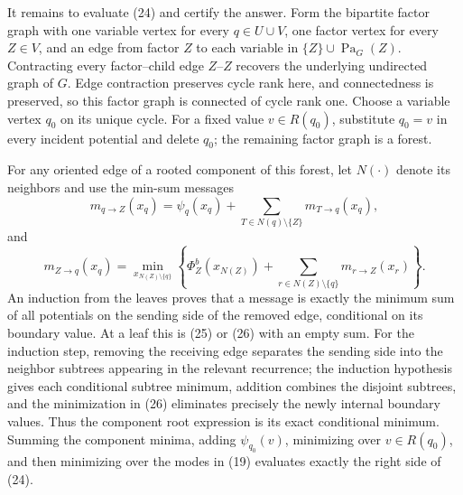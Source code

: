 It remains to evaluate (24) and certify the answer.  Form the bipartite factor graph with one variable vertex for every \(q\in U\cup V\), one factor vertex for every \(Z\in V\), and an edge from factor \(Z\) to each variable in \(\{Z\}\cup\operatorname{Pa}_G(Z)\).  Contracting every factor--child edge \(Z\text{--}Z\) recovers the underlying undirected graph of \(G\).  Edge contraction preserves cycle rank here, and connectedness is preserved, so this factor graph is connected of cycle rank one.  Choose a variable vertex \(q_0\) on its unique cycle.  For a fixed value \(v\in R(q_0)\), substitute \(q_0=v\) in every incident potential and delete \(q_0\); the remaining factor graph is a forest.

For any oriented edge of a rooted component of this forest, let \(N(\cdot)\) denote its neighbors and use the min-sum messages
\[
 m_{q\to Z}(x_q)
 =\psi_q(x_q)+
   \sum_{T\in N(q)\setminus\{Z\}}m_{T\to q}(x_q),                    \tag{25}
\]
and
\[
 m_{Z\to q}(x_q)
 =\min_{x_{N(Z)\setminus\{q\}}}
 \left\{
  \Phi_Z^b(x_{N(Z)})+
  \sum_{r\in N(Z)\setminus\{q\}}m_{r\to Z}(x_r)
 \right\}.                                                           \tag{26}
\]
An induction from the leaves proves that a message is exactly the minimum sum of all potentials on the sending side of the removed edge, conditional on its boundary value.  At a leaf this is (25) or (26) with an empty sum.  For the induction step, removing the receiving edge separates the sending side into the neighbor subtrees appearing in the relevant recurrence; the induction hypothesis gives each conditional subtree minimum, addition combines the disjoint subtrees, and the minimization in (26) eliminates precisely the newly internal boundary values.  Thus the component root expression is its exact conditional minimum.  Summing the component minima, adding \(\psi_{q_0}(v)\), minimizing over \(v\in R(q_0)\), and then minimizing over the modes in (19) evaluates exactly the right side of (24).

